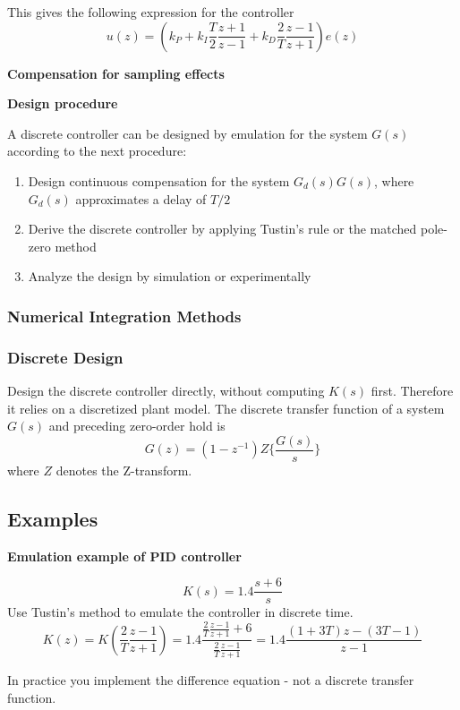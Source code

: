 This gives the following expression for the controller
$$u(z) = (k_P+k_I \frac{T}{2} \frac{z+1}{z-1}+k_D \frac{2}{T} \frac{z-1}{z+1})e(z)$$


\textbf{Compensation for sampling effects}

\newpage
\textbf{Design procedure}

A discrete controller can be designed by emulation for the system $G(s)$ according to the next procedure:

\begin{enumerate}
	\item{Design continuous compensation for the system $G_d(s)G(s)$, where $G_d(s)$ approximates a delay of $T/2$}
	\item{Derive the discrete controller by applying Tustin's rule or the matched pole-zero method}
	\item{Analyze the design by simulation or experimentally}
\end{enumerate}



\subsubsection{Numerical Integration Methods}





\subsubsection{Discrete Design}
Design the discrete controller directly, without computing $K(s)$ first.
Therefore it relies on a discretized plant model. The discrete transfer function of a system $G(s)$ and preceding
zero-order hold is
$$G(z) = (1-z^{-1})Z\{\frac{G(s)}{s}\}$$
where $Z$ denotes the Z-transform.

\subsection{Examples}

\textbf{Emulation example of PID controller}

$$K(s) = 1.4 \frac{s+6}{s}$$
Use Tustin's method to emulate the controller in discrete time.
$$K(z) = K(\frac{2}{T} \frac{z-1}{z+1}) = 1.4 \frac{\frac{2}{T} \frac{z-1}{z+1}+6}{\frac{2}{T} \frac{z-1}{z+1}}
	= 1.4 \frac{(1+3T)z-(3T-1)}{z-1}$$

In practice you implement the difference equation - not a discrete transfer function.
